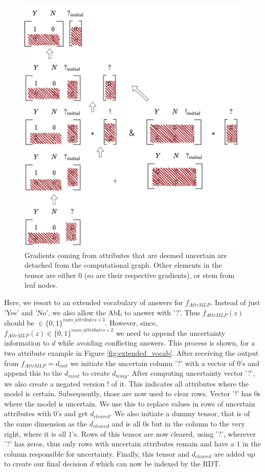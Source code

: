 \documentclass[a4paper,cleardoubleempty,BCOR1cm, 11pt]{report}
\begin{document}
\begin{figure}[t!]
\begin{minipage}{0.45\textwidth}
		\includegraphics[width=1\textwidth]{images/extended_vocab_backward.pdf}
		\caption{Gradients coming from attributes that are deemed uncertain are detached from the computational graph. Other elements in the tensor are either $0$ (so are their respective gradients), or stem from leaf nodes.}
		\label{fig:extended_vocab_backward}
	\end{minipage}
\end{figure}
Here, we resort to an extended vocabulary of answers for $f_{AttrMLP}$. Instead of just 'Yes' and 'No', we also allow the AbL to answer with '?'. Thus $f_{AttrMLP}(z)$ should be $\in \lbrace 0,1 \rbrace^{num\_attributes \times 3}$. However, since, $f_{AttrMLP}(z) \in \lbrace 0,1 \rbrace^{num\_attributes \times 2}$ we need to append the uncertainty information to $d$ while avoiding conflicting answers. This process is shown, for a two attribute example in Figure \ref{fig:extended_vocab}. After receiving the output from $f_{AttrMLP} = d_{init}$ we initiate the uncertain column '?' with a vector of $0$'s and append this to the $d_{inint}$ to create $d_{temp}$. After computing uncertainty vector '?', we also create a negated version $!$ of it. This indicates all attributes where the model is certain. Subsequently, those are now used to clear rows. Vector '!' has $0$s where the model is uncertain. We use this to replace values in rows of uncertain attributes with $0$'s and get $d_{cleared}$. We also initiate a dummy tensor, that is of the same dimension as the $d_{cleared}$ and is all $0$s but in the column to the very right, where it is all $1$'s. Rows of this tensor are now cleared, using '?', wherever '?' has zeros, thus only rows with uncertain attributes remain and have a $1$ in the column responsible for uncertainty. Finally, this tensor and $d_{cleared}$ are added up to create our final decision $d$ which can now be indexed by the RDT.\\
\end{document}
